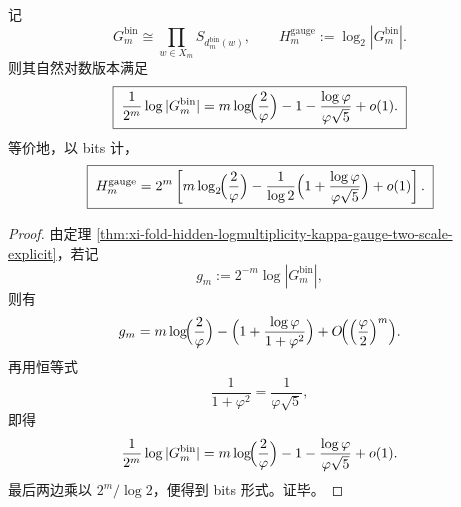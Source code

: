 \begin{theorem}[规范群熵的精确首项与常数漂移]\label{thm:xi-time-part70ad-gauge-entropy-leading-drift}
记
\[
G_m^{\mathrm{bin}}
\cong
\prod_{w\in X_m}S_{d_m^{\mathrm{bin}}(w)},
\qquad
H_m^{\mathrm{gauge}}:=\log_2|G_m^{\mathrm{bin}}|.
\]
则其自然对数版本满足
\[
\boxed{\;
\frac{1}{2^m}\log |G_m^{\mathrm{bin}}|
=
m\log\!\Bigl(\frac{2}{\varphi}\Bigr)
-1
-\frac{\log\varphi}{\varphi\sqrt5}
+o(1).\;}
\]
等价地，以 bits 计，
\[
\boxed{\;
H_m^{\mathrm{gauge}}
=
2^m\left[
m\log_2\!\Bigl(\frac{2}{\varphi}\Bigr)
-\frac{1}{\log 2}
\Bigl(
1+\frac{\log\varphi}{\varphi\sqrt5}
\Bigr)
+o(1)
\right].\;}
\]
\end{theorem}
\begin{proof}
由定理 \ref{thm:xi-fold-hidden-logmultiplicity-kappa-gauge-two-scale-explicit}，若记
\[
g_m:=2^{-m}\log|G_m^{\mathrm{bin}}|,
\]
则有
\[
g_m
=
m\log\!\Bigl(\frac{2}{\varphi}\Bigr)
-\Bigl(1+\frac{\log\varphi}{1+\varphi^2}\Bigr)
+O\!\Bigl(\Bigl(\frac{\varphi}{2}\Bigr)^m\Bigr).
\]
再用恒等式
\[
\frac{1}{1+\varphi^2}=\frac{1}{\varphi\sqrt5},
\]
即得
\[
\frac{1}{2^m}\log |G_m^{\mathrm{bin}}|
=
m\log\!\Bigl(\frac{2}{\varphi}\Bigr)
-1
-\frac{\log\varphi}{\varphi\sqrt5}
+o(1).
\]
最后两边乘以 \(2^m/\log 2\)，便得到 bits 形式。证毕。
\end{proof}


